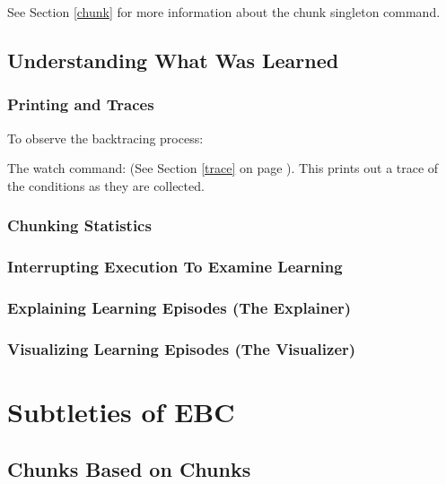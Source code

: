 See Section \ref{chunk} for more information about the chunk singleton command.

\subsection{Understanding What Was Learned}

\subsubsection{Printing and Traces}

To observe the backtracing process:

The watch command:  (See Section \ref{trace} on page \pageref{trace}). This prints out a trace of the conditions as they are collected.

\subsubsection{Chunking Statistics}

\subsubsection{Interrupting Execution To Examine Learning}

\subsubsection{Explaining Learning Episodes (The Explainer)}

\subsubsection{Visualizing Learning Episodes (The Visualizer)}


\section{Subtleties of EBC}
\label{CHUNKING-subtleties}


\subsection{Chunks Based on Chunks}

